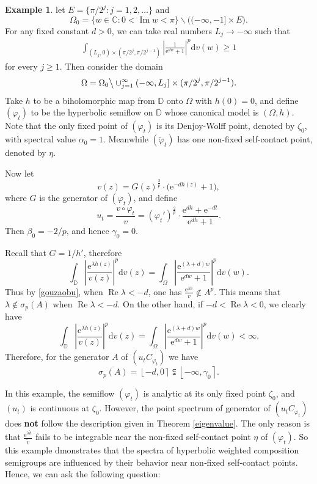 \documentclass{amsart}
\theoremstyle{proclaim}
\theoremstyle{fancyproclaim}
\theoremstyle{definition}
\newtheorem{example}[theorem]{Example}
\theoremstyle{fancystatement}
\numberwithin{equation}{section}
\begin{document}
\begin{example}\label{yigeyue}
 let $E=\{\pi/2^j : j=1, 2, \dots\}$ and 
$$\Omega_0=\{w\in\mathbb{C} : 0<\operatorname{Im}w<\pi\}\backslash \bigl((-\infty, -1]\times E\bigr).$$
For any fixed constant $d>0$, we can take real numbers $L_j\to-\infty$ such that
\begin{align}\label{gouzaobu}
\int_{(L_j, 0)\times(\pi/2^j, \pi/2^{j-1})}\left|\frac{1}{\mathrm{e}^{dw}+1}\right|^p\mathrm{d}v(w)\geq1
\end{align}
for every $j\geq 1$. Then consider the domain
$$\Omega=\Omega_0\big\backslash\cup_{j=1}^\infty(-\infty, L_j]\times(\pi/2^j, \pi/2^{j-1}).$$
Take $h$ to be a biholomorphic map from $\mathbb{D}$ onto $\Omega$ with $h(0)=0$, and define $(\varphi_t)$ to be the hyperbolic semiflow on $\mathbb{D}$ whose canonical model is $(\Omega, h)$.  Note that the only fixed point of $(\varphi_t)$ is its Denjoy-Wolff point, denoted by $\zeta_0$, with spectral value $\alpha_0=1$. Meanwhile $(\tilde{\varphi}_t)$ has one non-fixed self-contact point, denoted by $\eta$.


Now let
$$v(z)=G(z)^{\frac{2}{p}}\cdot\big(\mathrm{e}^{-dh(z)}+1\big),$$
where $G$ is the generator of $(\varphi_t)$, and define
$$u_t=\frac{v\circ\varphi_t}{v}=\left(\varphi_t'\right)^{\frac{2}{p}}\cdot\frac{\mathrm{e}^{dh}+\mathrm{e}^{-dt}}{\mathrm{e}^{dh}+1}.$$ 
Then $\beta_0=-2/p$, and hence $\gamma_0=0$. 


Recall that $G=1/h'$, therefore
$$\int_{\mathbb{D}}\left|\frac{\mathrm{e}^{\lambda h(z)}}{v(z)}\right|^p\mathrm{d}v(z)=\int_\Omega\left|\frac{\mathrm{e}^{(\lambda +d)w}}{\mathrm{e}^{dw}+1}\right|^p\mathrm{d}v(w).$$ 
Thus by \eqref{gouzaobu}, when $\operatorname{Re}\lambda<-d$, one has $\frac{\mathrm{e}^{\lambda h}}{v}\notin A^p$. This means that $\lambda\notin\sigma_p(A)$ when $\operatorname{Re}\lambda<-d$.   On the other hand, if $-d<\operatorname{Re}\lambda<0$, we clearly have
$$\int_{\mathbb{D}}\left|\frac{\mathrm{e}^{\lambda h(z)}}{v(z)}\right|^p\mathrm{d}v(z)=\int_\Omega\left|\frac{\mathrm{e}^{(\lambda +d)w}}{\mathrm{e}^{dw}+1}\right|^p\mathrm{d}v(w)<\infty.$$
Therefore, for the generator $A$ of $(u_tC_{\varphi_t})$ we have
$$\overline{\sigma_p(A)}=\left\lfloor-d, 0\right\rceil\subsetneqq\left\lfloor-\infty, \gamma_0\right\rceil.$$

\end{example}

In this example, the semiflow $(\varphi_t)$ is analytic at its only fixed point $\zeta_0$, and $(u_t)$ is continuous at $\zeta_0$. However, the point spectrum of generator of $(u_tC_{\varphi_t})$ does \textbf{not} follow the description given in Theorem \ref{eigenvalue}. The only reason is that $\frac{\mathrm{e}^{\lambda \tilde{h}}}{\tilde{v}}$ fails to be integrable near the non-fixed self-contact point $\eta$ of $(\varphi_t)$. So this example dmonstrates that the spectra of hyperbolic weighted composition semigroups are influenced by their behavior near non‑fixed self‑contact points. Hence, we can ask the following question:
\\
\end{document}
